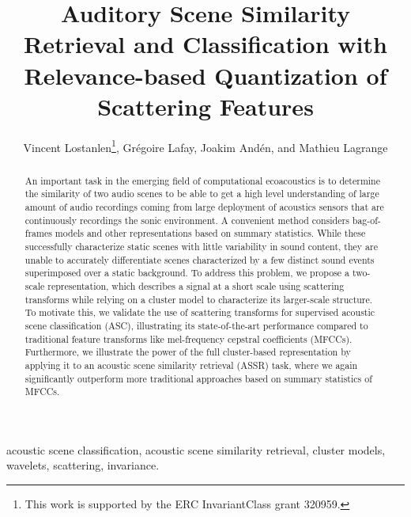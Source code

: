 \documentclass[journal]{IEEEtran}
\begin{document}
%
\title{Auditory Scene Similarity Retrieval and Classification with Relevance-based Quantization of Scattering Features}

\author{Vincent Lostanlen\thanks{This work is supported by the ERC InvariantClass grant 320959.}, Gr\'egoire Lafay, Joakim And\'en, and Mathieu Lagrange}


\maketitle

\begin{abstract}

An important task in the emerging field of computational ecoacoustics is to determine the similarity of two audio scenes to be able to get a high level understanding of large amount of audio recordings coming from large deployment of acoustics sensors that are continuously recordings the sonic environment. A convenient method considers bag-of-frames models and other representations based on summary statistics. While these successfully characterize static scenes with little variability in sound content, they are unable to accurately differentiate scenes characterized by a few distinct sound events superimposed over a static background. To address this problem, we propose a two-scale representation, which describes a signal at a short scale using scattering transforms while relying on a cluster model to characterize its larger-scale structure. To motivate this, we validate the use of scattering transforms for supervised acoustic scene classification (ASC), illustrating its state-of-the-art performance compared to traditional feature transforms like mel-frequency cepstral coefficients (MFCCs). Furthermore, we illustrate the power of the full cluster-based representation by applying it to an acoustic scene similarity retrieval (ASSR) task, where we again significantly outperform more traditional approaches based on summary statistics of MFCCs.

\end{abstract}

\begin{IEEEkeywords}
acoustic scene classification, acoustic scene similarity retrieval, cluster models, wavelets, scattering, invariance.
\end{IEEEkeywords}
\end{document}
